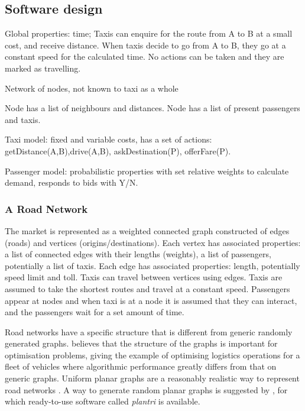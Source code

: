 \subsection{Software design}
\label{sec:design:software}

Global properties: time; Taxis
can enquire for the route from A to B at a small cost, and receive distance.
When taxis decide to go from A to B, they go at a constant speed for the
calculated time. No actions can be taken and they are marked as travelling.

Network of nodes, not known to taxi as a whole

Node has a list of neighbours and distances.
Node has a list of present passengers and taxis.

Taxi model: fixed and variable costs, has a set of actions:
getDistance(A,B),drive(A,B), askDestination(P), offerFare(P).

Passenger model: probabilistic properties with set relative weights to
calculate demand, responds to bids with Y/N.

\subsubsection{A Road Network}
\label{sec:design:network}

The market is represented as a weighted connected graph constructed of edges
(roads) and vertices (origins/destinations). Each vertex has associated
properties: a list of connected edges with their lengths (weights), a list of
passengers, potentially a list of taxis. Each edge has associated properties:
length, potentially speed limit and toll. Taxis can travel between vertices
using edges. Taxis are assumed to take the shortest routes and travel at a
constant speed. Passengers appear at nodes and when taxi is at a node it is
assumed that they can interact, and the passengers wait for a set amount of
time.

Road networks have a specific structure that is different from generic randomly
generated graphs. \textcite{Eisenstat2011graphs+quadtree} believes that the
structure of the graphs is important for optimisation problems, giving the
example of optimising logistics operations for a fleet of vehicles where
algorithmic performance greatly differs from that on generic graphs. Uniform
planar graphs are a reasonably realistic way to represent road networks
\parencite{Eisenstat2011graphs+quadtree, Masucci2009graphs+london}. A way to
generate random planar graphs is suggested by
\textcite{Brinkmann2007graphs+generate}, for which ready-to-use software called
\textit{plantri} is available. 

